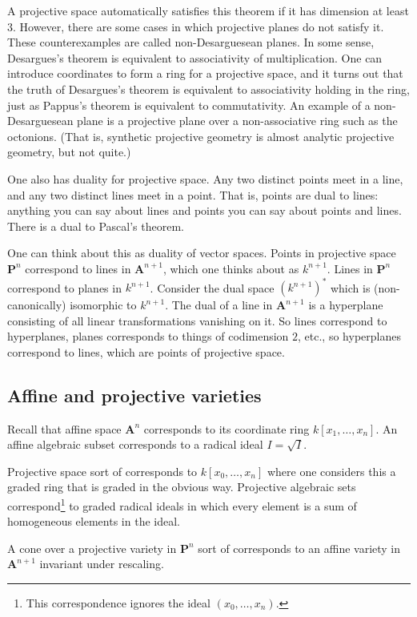 \documentclass[11pt, oneside,margin=1in]{article}
\begin{document}
A projective space automatically satisfies this theorem if it has dimension at least $3$. However, there are some cases in which projective planes do not satisfy it. These counterexamples are called non-Desarguesean planes. In some sense, Desargues's theorem is equivalent to associativity of multiplication. One can introduce coordinates to form a ring for a projective space, and it turns out that the truth of Desargues's theorem is equivalent to associativity holding in the ring, just as Pappus's theorem is equivalent to commutativity. An example of a non-Desarguesean plane is a projective plane over a non-associative ring such as the octonions. (That is, synthetic projective geometry is almost analytic projective geometry, but not quite.)

One also has duality for projective space. Any two distinct points meet in a line, and any two distinct lines meet in a point. That is, points are dual to lines: anything you can say about lines and points you can say about points and lines. There is a dual to Pascal's theorem. 

One can think about this as duality of vector spaces. Points in projective space $\mathbf{P}^n$ correspond to lines in $\mathbf{A}^{n+1}$, which one thinks about as $k^{n+1}$. Lines in $\mathbf{P}^n$ correspond to planes in $k^{n+1}$. Consider the dual space $(k^{n+1})^*$ which is (non-canonically) isomorphic to $k^{n+1}$. The dual of a line in $\mathbf{A}^{n+1}$ is a hyperplane consisting of all linear transformations vanishing on it. So lines correspond to hyperplanes, planes corresponds to things of codimension $2$, etc., so hyperplanes correspond to lines, which are points of projective space.
\subsection{Affine and projective varieties}

Recall that affine space $\mathbf{A}^n$ corresponds to its coordinate ring $k[x_1,\hdots, x_n]$. An affine algebraic subset corresponds to a radical ideal $I=\sqrt{I} $.

Projective space sort of corresponds to $k[x_0,\hdots, x_n]$ where one considers this a graded ring that is graded in the obvious way. Projective algebraic sets correspond\footnote{This correspondence ignores the ideal $(x_0,\hdots, x_n)$.} to graded radical ideals in which every element is a sum of homogeneous elements in the ideal.

A cone over a projective variety in $\mathbf{P}^n$ sort of corresponds to an affine variety in $\mathbf{A}^{n+1}$ invariant under rescaling.
\end{document}

